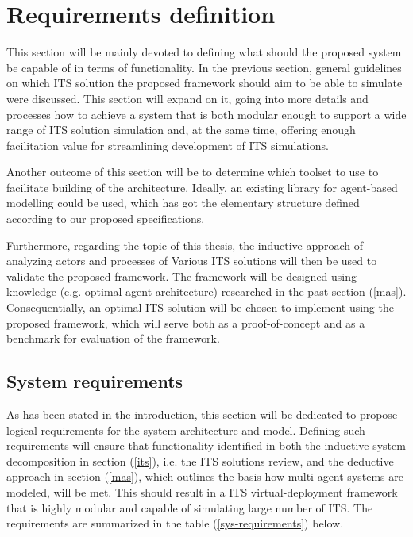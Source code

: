 \documentclass[main.tex]{subfiles}
\begin{document}
\section{Requirements definition}\label{sec-requirements}

This section will be mainly devoted to defining what should the proposed system be capable of in terms 
of functionality. In the previous section, general guidelines on which ITS solution the proposed 
framework should aim to be able to simulate were discussed. This section will expand on it, 
going into more details and processes how to achieve a system that is both modular enough to support 
a wide range of ITS solution simulation and, at the same time, offering enough facilitation value 
for streamlining development of ITS simulations. 

Another outcome of this section will be to determine which toolset to use to facilitate building of 
the architecture. Ideally, an existing library for agent-based modelling could be used, which has got 
the elementary structure defined according to our proposed specifications.

Furthermore, regarding the topic of this thesis, the inductive approach of analyzing actors and
processes of Various ITS solutions will then be used to validate the proposed framework. The
framework will be designed using knowledge (e.g. optimal agent architecture) researched in the
past section (\ref{mas}).  Consequentially, an optimal ITS solution will be chosen to implement
using the proposed framework, which will serve both as a proof-of-concept and as a benchmark
for evaluation of the framework.  

\subsection{System requirements}

As has been stated in the introduction, this section will be dedicated to propose logical
requirements for the system architecture and model. Defining such requirements will ensure that
functionality identified in both the inductive system decomposition in section (\ref{its}),
i.e. the ITS solutions review, and the deductive approach in section (\ref{mas}), which 
outlines the basis how multi-agent systems are modeled, will be met. This should result 
in a ITS virtual-deployment framework that is highly modular and capable of simulating large 
number of ITS. The requirements are summarized in the table (\ref{sys-requirements}) below.
\end{document}

